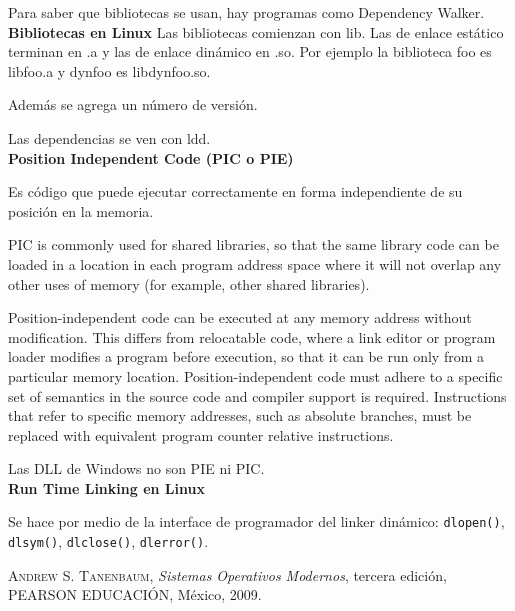 \documentclass[a4paper, twoside]{article}
\begin{document}
Para saber que bibliotecas se usan, hay programas como Dependency Walker.\\

\textbf{Bibliotecas en Linux}
Las bibliotecas comienzan con lib. Las de enlace estático terminan en .a y las de enlace dinámico en .so. Por ejemplo la biblioteca foo es libfoo.a y dynfoo es libdynfoo.so.

Además se agrega un número de versión.

Las dependencias se ven con ldd.\\

\textbf{Position Independent Code (PIC o PIE)}

Es código que puede ejecutar correctamente en forma independiente de su posición en la memoria.

PIC is commonly used for shared libraries, so that the same library code can be loaded in a location in each program address space where it will not overlap any other uses of memory (for example, other shared libraries).

Position-independent code can be executed at any memory address without modification. This differs from relocatable code, where a link editor or program loader modifies a program before execution, so that it can be run only from a particular memory location. Position-independent code must adhere to a specific set of semantics in the source code and compiler support is required. Instructions that refer to specific memory addresses, such as absolute branches, must be replaced with equivalent program counter relative instructions.

Las DLL de Windows no son PIE ni PIC.\\

\textbf{Run Time Linking en Linux}

Se hace por medio de la interface de programador del linker dinámico: \texttt{dlopen()}, \texttt{dlsym()}, \texttt{dlclose()}, \texttt{dlerror()}.


\newpage
\newcommand{\bibliographyname}{Bibliografía} %
\addcontentsline{toc}{section}{\bibliographyname} %
\renewcommand\refname{\bibliographyname} %
\begin{thebibliography}{X}
	 \textsc{Andrew S. Tanenbaum}, \textit{Sistemas Operativos Modernos}, tercera edición, PEARSON EDUCACIÓN, México, 2009.
\end{thebibliography}


\makehistorial
\end{document}
